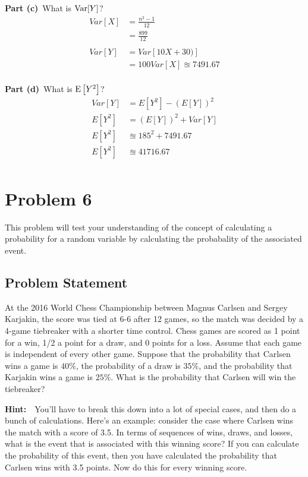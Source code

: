\documentclass[12pt]{article}
\theoremstyle{definition}
\begin{document}
\newpage
\noindent
{\bf Part (c)}\ What is $\hbox{Var}[Y]$?
\begin{align*}
Var[X] &= \frac{n^2 - 1}{12}\\
&= \frac{899}{12}\\\\
Var[Y] &= Var[10X + 30)]\\
&=100Var[X] \approxeq 7491.67\\
\end{align*}


\noindent
{\bf Part (d)}\ What is $\hbox{E}\left[ Y^2 \right ]$?
\begin{align*}
Var[Y] &= E[Y^2] - (E[Y])^2\\
E[Y^2] &= (E[Y])^2 + Var[Y]\\
E[Y^2] &\approxeq 185^2 + 7491.67\\
E[Y^2] &\approxeq 41716.67\\
\end{align*}


\newpage
\section*{Problem 6}

This problem will test your understanding of the concept of calculating a probability for a random variable by calculating the probabality of the associated event.

\subsection*{Problem Statement}

At the 2016 World Chess Championship between Magnus Carlsen and Sergey Karjakin, the score was tied at 6-6 after 12 games, so the match was decided by a 4-game tiebreaker with a shorter time control. Chess games are scored as 1 point for a win, 1/2 a point for a draw, and 0 points for a loss. Assume that each game is independent of every other game. Suppose that the probability that Carlsen wins a game is $40\%$, the probability of a draw is $35\%$, and the probability that Karjakin wins a game is $25\%$. What is the probability that Carlsen will win the tiebreaker?

\bigskip
\noindent
{\bf Hint:}\ \ You'll have to break this down into a lot of special cases, and then do a bunch of calculations. Here's an example: consider the case where Carlsen wins the match with a score of 3.5. In terms of sequences of wins, draws, and losses, what is the event that is associated with this winning score? If you can calculate the probability of this event, then you have calculated the probability that Carlsen wins with 3.5 points. Now do this for every winning score.
\end{document}
